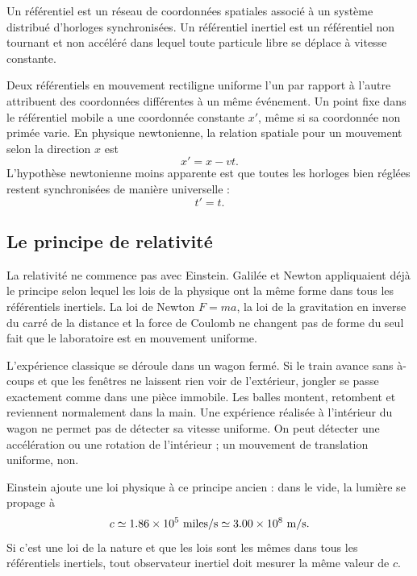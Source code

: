\begin{definition}
Un référentiel est un réseau de coordonnées spatiales associé à un système distribué d’horloges synchronisées. Un référentiel inertiel est un référentiel non tournant et non accéléré dans lequel toute particule libre se déplace à vitesse constante.
\end{definition}

Deux référentiels en mouvement rectiligne uniforme l’un par rapport à l’autre attribuent des coordonnées différentes à un même événement. Un point fixe dans le référentiel mobile a une coordonnée constante \(x'\), même si sa coordonnée non primée varie. En physique newtonienne, la relation spatiale pour un mouvement selon la direction \(x\) est
\begin{equation}
x'=x-vt.
\label{eq:sr1-galilean-space}
\end{equation}
L’hypothèse newtonienne moins apparente est que toutes les horloges bien réglées restent synchronisées de manière universelle :
\begin{equation}
t'=t.
\label{eq:sr1-absolute-time}
\end{equation}

\subsection{Le principe de relativité}

La relativité ne commence pas avec Einstein. Galilée et Newton appliquaient déjà le principe selon lequel les lois de la physique ont la même forme dans tous les référentiels inertiels. La loi de Newton \(F=ma\), la loi de la gravitation en inverse du carré de la distance et la force de Coulomb ne changent pas de forme du seul fait que le laboratoire est en mouvement uniforme.

L’expérience classique se déroule dans un wagon fermé. Si le train avance sans à-coups et que les fenêtres ne laissent rien voir de l’extérieur, jongler se passe exactement comme dans une pièce immobile. Les balles montent, retombent et reviennent normalement dans la main. Une expérience réalisée à l’intérieur du wagon ne permet pas de détecter sa vitesse uniforme. On peut détecter une accélération ou une rotation de l’intérieur ; un mouvement de translation uniforme, non.

Einstein ajoute une loi physique à ce principe ancien : dans le vide, la lumière se propage à
\begin{equation}
c \simeq 1.86\times 10^5\ {\rm miles/s}
   \simeq 3.00\times 10^8\ {\rm m/s}.
\end{equation}
Si c’est une loi de la nature et que les lois sont les mêmes dans tous les référentiels inertiels, tout observateur inertiel doit mesurer la même valeur de \(c\).

